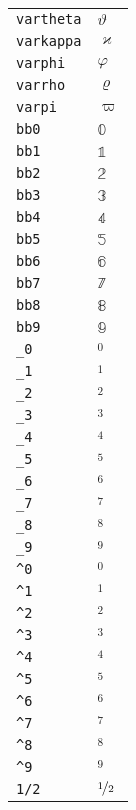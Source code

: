 \begin{longtable}{ll}
\texttt{vartheta}&${}\vartheta {}$\\
\texttt{varkappa}&${}\varkappa {}$\\
\texttt{varphi}&${}\varphi {}$\\
\texttt{varrho}&${}\varrho {}$\\
\texttt{varpi}&${}\varpi {}$\\
\texttt{bb0}&${}\mathbb{0}{}$\\
\texttt{bb1}&${}\mathbb{1}{}$\\
\texttt{bb2}&${}\mathbb{2}{}$\\
\texttt{bb3}&${}\mathbb{3}{}$\\
\texttt{bb4}&${}\mathbb{4}{}$\\
\texttt{bb5}&${}\mathbb{5}{}$\\
\texttt{bb6}&${}\mathbb{6}{}$\\
\texttt{bb7}&${}\mathbb{7}{}$\\
\texttt{bb8}&${}\mathbb{8}{}$\\
\texttt{bb9}&${}\mathbb{9}{}$\\
\texttt{\_0}&${}_0 {}$\\
\texttt{\_1}&${}_1 {}$\\
\texttt{\_2}&${}_2 {}$\\
\texttt{\_3}&${}_3 {}$\\
\texttt{\_4}&${}_4 {}$\\
\texttt{\_5}&${}_5 {}$\\
\texttt{\_6}&${}_6 {}$\\
\texttt{\_7}&${}_7 {}$\\
\texttt{\_8}&${}_8 {}$\\
\texttt{\_9}&${}_9 {}$\\
\texttt{\textasciicircum 0}&${}^0 {}$\\
\texttt{\textasciicircum 1}&${}^1 {}$\\
\texttt{\textasciicircum 2}&${}^2 {}$\\
\texttt{\textasciicircum 3}&${}^3 {}$\\
\texttt{\textasciicircum 4}&${}^4 {}$\\
\texttt{\textasciicircum 5}&${}^5 {}$\\
\texttt{\textasciicircum 6}&${}^6 {}$\\
\texttt{\textasciicircum 7}&${}^7 {}$\\
\texttt{\textasciicircum 8}&${}^8 {}$\\
\texttt{\textasciicircum 9}&${}^9 {}$\\
\texttt{1/2}&${}\nicefrac{1}{2} {}$\\

\end{longtable}
